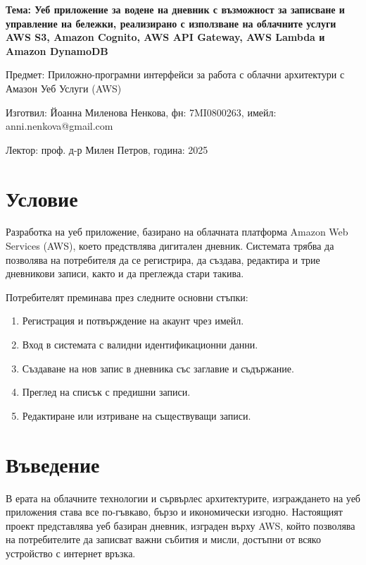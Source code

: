 \documentclass[12pt]{article}
\begin{document}
\begin{center}
\LARGE{\textbf{Тема: Уеб приложение за водене на дневник с възможност за записване и управление на бележки, реализирано с използване на облачните услуги AWS S3, Amazon Cognito, AWS API Gateway, AWS Lambda и Amazon DynamoDB}}

\bigskip
\Large{Предмет: Приложно-програмни интерфейси за работа с облачни архитектури с Амазон Уеб Услуги (AWS)}

\medskip
\Large{Изготвил: Йоанна Миленова Ненкова, фн: 7MI0800263, имейл: anni.nenkova@gmail.com}

\medskip
\Large{Лектор: проф. д-р Милен Петров, година: 2025}

\bigskip
\end{center}

\newpage
\tableofcontents
\bigskip
\bigskip
\newpage

\section{Условие}

\noindent Разработка на уеб приложение, базирано на облачната платформа Amazon Web Services (AWS), което предствлява дигитален дневник. Системата трябва да позволява на потребителя да се регистрира, да създава, редактира и трие дневникови записи, както и да преглежда стари такива.

\medskip

\noindent Потребителят преминава през следните основни стъпки:
\begin{enumerate}
\item Регистрация и потвърждение на акаунт чрез имейл.
\item Вход в системата с валидни идентификационни данни.
\item Създаване на нов запис в дневника със заглавие и съдържание.
\item Преглед на списък с предишни записи.
\item Редактиране или изтриване на съществуващи записи.
\end{enumerate}

\section{Въведение}

В ерата на облачните технологии и сървърлес архитектурите, изграждането на уеб приложения става все по-гъвкаво, бързо и икономически изгодно. Настоящият проект представлява уеб базиран дневник, изграден върху AWS, който позволява на потребителите да записват важни събития и мисли, достъпни от всяко устройство с интернет връзка.
\end{document}
